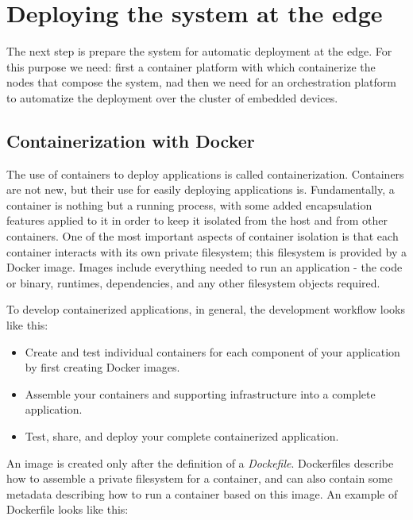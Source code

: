 \section{Deploying the system at the edge}
The next step is prepare the system for automatic deployment at the edge. For this purpose we need: first a container platform with which containerize the nodes that compose the system, nad then we need for an orchestration platform to automatize the deployment over the cluster of embedded devices.

\subsection{Containerization with Docker}
The use of containers to deploy applications is called containerization. Containers are not new, but their use for easily deploying applications is.
Fundamentally, a container is nothing but a running process, with some added encapsulation features applied to it in order to keep it isolated from the host and from other containers. One of the most important aspects of container isolation is that each container interacts with its own private filesystem; this filesystem is provided by a Docker image. Images include everything needed to run an application - the code or binary, runtimes, dependencies, and any other filesystem objects required.

To develop containerized applications, in general, the development workflow looks like this:
\begin{itemize}
	\item Create and test individual containers for each component of your application by first creating Docker images.
	\item Assemble your containers and supporting infrastructure into a complete application.
	\item Test, share, and deploy your complete containerized application.
\end{itemize}

An image is created only after the definition of a \textit{Dockefile}. Dockerfiles describe how to assemble a private filesystem for a container, and can also contain some metadata describing how to run a container based on this image. An example of Dockerfile looks like this:

